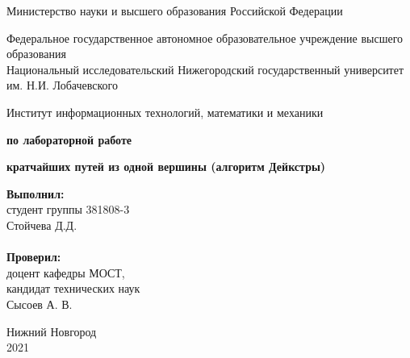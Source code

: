 \documentclass{report}
\begin{document}
\begin{titlepage}

\begin{center}
Министерство науки и высшего образования Российской Федерации
\end{center}

\begin{center}
Федеральное государственное автономное образовательное учреждение высшего образования \\
Национальный исследовательский Нижегородский государственный университет им. Н.И. Лобачевского
\end{center}

\begin{center}
Институт информационных технологий, математики и механики
\end{center}

\vspace{4em}

\begin{center}
\textbf{ по лабораторной работе} \\
\end{center}
\begin{center}
\textbf{ кратчайших путей из одной вершины (алгоритм Дейкстры)} \\
\end{center}

\vspace{4em}

\newbox{\lbox}
\newlength{\maxl}
\setlength{\maxl}{\wd\lbox}
\hfill\parbox{7cm}{
\hspace*{5cm}\hspace*{-5cm}\textbf{Выполнил:} \\ студент группы 381808-3 \\ Стойчева Д.Д.\\
\\
\hspace*{5cm}\hspace*{-5cm}\textbf{Проверил:}\\ доцент кафедры МОСТ, \\ кандидат технических наук \\ Сысоев А. В.
}

\vspace{\fill}

\begin{center} Нижний Новгород \\ 2021 \end{center}

\end{titlepage}
\end{document}
